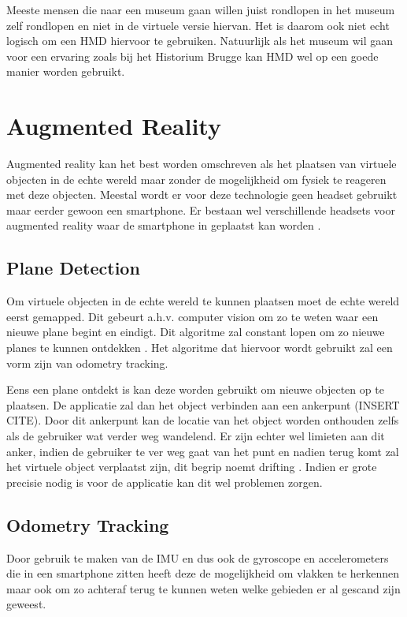 Meeste mensen die naar een museum gaan willen juist rondlopen in het museum zelf rondlopen en niet in de virtuele versie hiervan. Het is daarom ook niet echt logisch om een HMD hiervoor te gebruiken. Natuurlijk als het museum wil gaan voor een ervaring zoals bij het Historium Brugge kan HMD wel op een goede manier worden gebruikt.

\section{Augmented Reality} \label{sec:augmentedreality}
Augmented reality kan het best worden omschreven als het plaatsen van virtuele objecten in de echte wereld maar zonder de mogelijkheid om fysiek te reageren met deze objecten. Meestal wordt er voor deze technologie geen headset gebruikt maar eerder gewoon een smartphone. Er bestaan wel verschillende headsets voor augmented reality waar de smartphone in geplaatst kan worden \autocite{Schops2014}.

\subsection{Plane Detection}
Om virtuele objecten in de echte wereld te kunnen plaatsen moet de echte wereld eerst gemapped. Dit gebeurt a.h.v. computer vision om zo te weten waar een nieuwe plane begint en eindigt. Dit algoritme zal constant lopen om zo nieuwe planes te kunnen ontdekken \autocite{Xu2018}. Het algoritme dat hiervoor wordt gebruikt zal een vorm zijn van odometry tracking.

Eens een plane ontdekt is kan deze worden gebruikt om nieuwe objecten op te plaatsen. De applicatie zal dan het object verbinden aan een ankerpunt (INSERT CITE). Door dit ankerpunt kan de locatie van het object worden onthouden zelfs als de gebruiker wat verder weg wandelend. Er zijn echter wel limieten aan dit anker, indien de gebruiker te ver weg gaat van het punt en nadien terug komt zal het virtuele object verplaatst zijn, dit begrip noemt drifting \autocite{You1999}. Indien er grote precisie nodig is voor de applicatie kan dit wel problemen zorgen.

\subsection{Odometry Tracking}

Door gebruik te maken van de IMU en dus ook de gyroscope en accelerometers die in een smartphone zitten heeft deze de mogelijkheid om vlakken te herkennen maar ook om zo achteraf terug te kunnen weten welke gebieden er al gescand zijn geweest. \autocite{Leutenegger2015}

